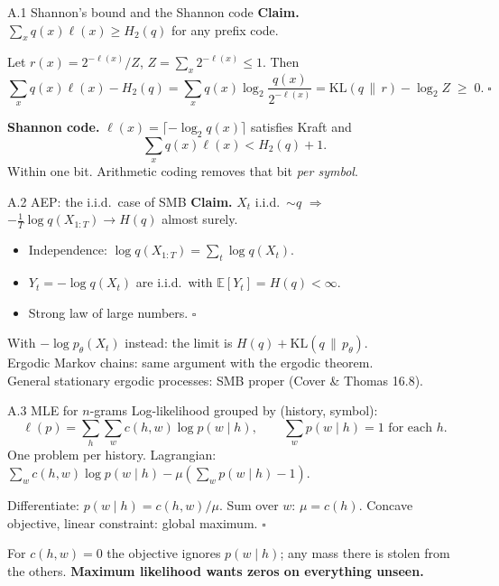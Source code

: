 \documentclass[11pt,aspectratio=169]{beamer}
\newcommand{\KL}{\mathrm{KL}}
\newcommand{\ptheta}{p_{\theta}}
\newcommand{\E}{\mathbb{E}}
\begin{document}
\begin{frame}{A.1 Shannon's bound and the Shannon code}
  \textbf{Claim.} $\sum_x q(x)\ell(x)\ge H_2(q)$ for any prefix code.

  \vspace{0.4em}
  Let $r(x) = 2^{-\ell(x)}/Z$, $Z = \sum_x 2^{-\ell(x)}\le 1$. Then
  \[
    \sum_x q(x)\ell(x) - H_2(q)
    = \sum_x q(x)\log_2\frac{q(x)}{2^{-\ell(x)}}
    = \KL(q\,\|\,r) - \log_2 Z \;\ge\; 0 .\;\square
  \]

  \vspace{0.8em}
  \textbf{Shannon code.} $\ell(x) = \lceil -\log_2 q(x)\rceil$ satisfies Kraft and
  \[
    \sum_x q(x)\ell(x) < H_2(q) + 1 .
  \]
  Within one bit. Arithmetic coding removes that bit \emph{per symbol}.
\end{frame}

\begin{frame}{A.2 AEP: the i.i.d.\ case of SMB}
  \textbf{Claim.} $X_t$ i.i.d.\ $\sim q$ $\Rightarrow$
  $-\frac{1}{T}\log q(X_{1:T})\to H(q)$ almost surely.

  \vspace{0.8em}
  \begin{itemize}
    \item Independence: $\log q(X_{1:T}) = \sum_t\log q(X_t)$.
    \item $Y_t = -\log q(X_t)$ are i.i.d.\ with $\E[Y_t] = H(q) < \infty$.
    \item Strong law of large numbers. $\square$
  \end{itemize}

  \vspace{0.8em}
  With $-\log\ptheta(X_t)$ instead: the limit is $H(q) + \KL(q\,\|\,\ptheta)$.\\
  Ergodic Markov chains: same argument with the ergodic theorem.\\
  General stationary ergodic processes: SMB proper (Cover \& Thomas 16.8).
\end{frame}

\begin{frame}{A.3 MLE for $n$-grams}
  Log-likelihood grouped by (history, symbol):
  \[
    \ell(p) = \sum_h\sum_w c(h,w)\log p(w\mid h),
    \qquad \sum_w p(w\mid h) = 1 \text{ for each } h .
  \]
  One problem per history. Lagrangian: $\sum_w c(h,w)\log p(w\mid h) - \mu(\sum_w p(w\mid h)-1)$.

  \vspace{0.6em}
  Differentiate: $p(w\mid h) = c(h,w)/\mu$. Sum over $w$: $\mu = c(h)$. Concave objective,
  linear constraint: global maximum. $\square$

  \vspace{0.8em}
  \begin{block}{}
    For $c(h,w) = 0$ the objective ignores $p(w\mid h)$; any mass there is stolen from the
    others. \textbf{Maximum likelihood wants zeros on everything unseen.}
  \end{block}
\end{frame}
\end{document}
